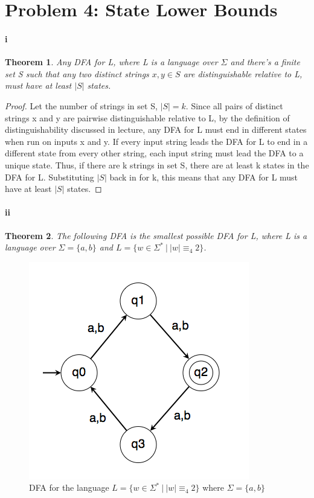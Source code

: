 \documentclass[10pt,letter]{article}
\newtheorem*{thm}{Theorem}
\begin{document}
\section*{Problem 4: State Lower Bounds}
\paragraph{i}
\begin{thm}Any DFA for L, where L is a language over $\Sigma$ and there's a finite set S such that any two distinct strings $x,y\in S$ are distinguishable relative to L, must have at least $|S|$ states. \end{thm}

\begin{proof} Let the number of strings in set S, $|S| = k$. Since all pairs of distinct strings x and y are pairwise distinguishable relative to L, by the definition of distinguishability discussed in lecture, any DFA for L must end in different states when run on inputs x and y. If every input string leads the DFA for L to end in a different state from every other string, each input string must lead the DFA to a unique state. Thus, if there are k strings in set S, there are at least k states in the DFA for L. Substituting $|S|$ back in for k, this means that any DFA for L must have at least $|S|$ states.
\end{proof}

\paragraph{ii}
\begin{thm} The following DFA is the smallest possible DFA for L, where L is a language over $\Sigma = \{a,b\}$ and $L=\{w \in \Sigma^*\ |\ |w| \equiv_4 2\}$.\end{thm}

\begin{figure}[h]
    \centering
    \includegraphics[width=0.4\linewidth]{hw6_4ii.png}
    \caption{DFA for the language $L=\{w \in \Sigma^*\ |\ |w| \equiv_4 2\}$ where $\Sigma = \{a,b\}$}
    \label{fig:q4ii}
\end{figure}
\end{document}
